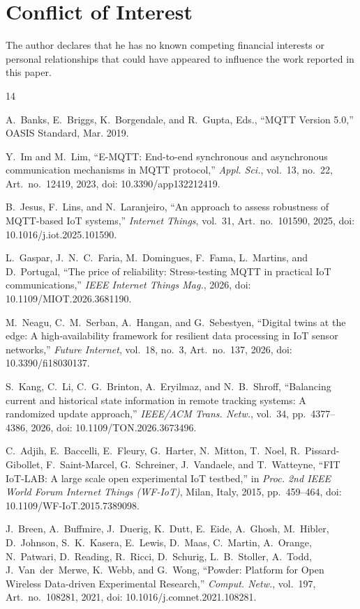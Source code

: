 \documentclass[journal]{IEEEtran}
\begin{document}
\section*{Conflict of Interest}
The author declares that he has no known competing financial interests or personal relationships that could have appeared to influence the work reported in this paper.
\begin{thebibliography}{14}

A.~Banks, E.~Briggs, K.~Borgendale, and R.~Gupta, Eds.,
``MQTT Version 5.0,'' OASIS Standard, Mar. 2019.

Y.~Im and M.~Lim,
``E-MQTT: End-to-end synchronous and asynchronous communication mechanisms in MQTT protocol,''
\emph{Appl. Sci.}, vol.~13, no.~22, Art.~no.~12419, 2023,
doi: 10.3390/app132212419.

B.~Jesus, F.~Lins, and N.~Laranjeiro,
``An approach to assess robustness of MQTT-based IoT systems,''
\emph{Internet Things}, vol.~31, Art.~no.~101590, 2025,
doi: 10.1016/j.iot.2025.101590.

L.~Gaspar, J.~N.~C.~Faria, M.~Domingues, F.~Fama, L.~Martins, and D.~Portugal,
``The price of reliability: Stress-testing MQTT in practical IoT communications,''
\emph{IEEE Internet Things Mag.}, 2026,
doi: 10.1109/MIOT.2026.3681190.

M.~Neagu, C.~M.~Serban, A.~Hangan, and G.~Sebestyen,
``Digital twins at the edge: A high-availability framework for resilient data processing in IoT sensor networks,''
\emph{Future Internet}, vol.~18, no.~3, Art.~no.~137, 2026,
doi: 10.3390/fi18030137.

S.~Kang, C.~Li, C.~G.~Brinton, A.~Eryilmaz, and N.~B.~Shroff,
``Balancing current and historical state information in remote tracking systems: A randomized update approach,''
\emph{IEEE/ACM Trans. Netw.}, vol.~34, pp.~4377--4386, 2026,
doi: 10.1109/TON.2026.3673496.

C.~Adjih, E.~Baccelli, E.~Fleury, G.~Harter, N.~Mitton, T.~Noel, R.~Pissard-Gibollet, F.~Saint-Marcel, G.~Schreiner, J.~Vandaele, and T.~Watteyne,
``FIT IoT-LAB: A large scale open experimental IoT testbed,''
in \emph{Proc. 2nd IEEE World Forum Internet Things (WF-IoT)}, Milan, Italy, 2015, pp.~459--464,
doi: 10.1109/WF-IoT.2015.7389098.

J.~Breen, A.~Buffmire, J.~Duerig, K.~Dutt, E.~Eide, A.~Ghosh, M.~Hibler, D.~Johnson, S.~K.~Kasera, E.~Lewis, D.~Maas, C.~Martin, A.~Orange, N.~Patwari, D.~Reading, R.~Ricci, D.~Schurig, L.~B.~Stoller, A.~Todd, J.~Van~der~Merwe, K.~Webb, and G.~Wong,
``Powder: Platform for Open Wireless Data-driven Experimental Research,''
\emph{Comput. Netw.}, vol.~197, Art.~no.~108281, 2021,
doi: 10.1016/j.comnet.2021.108281.



\end{thebibliography}
\end{document}
